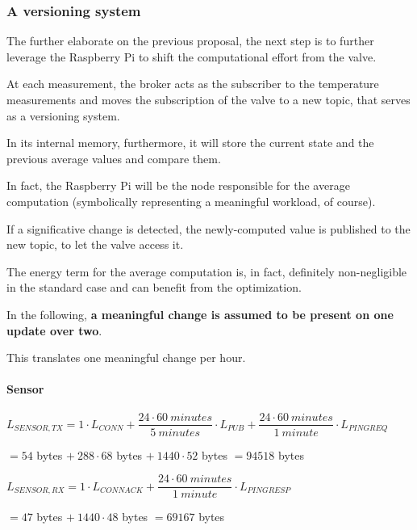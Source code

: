 \documentclass[a4paper,11pt]{article} %
\begin{document}
    \subsubsection{A versioning system}
    The further elaborate on the previous proposal, the next step is to further leverage the Raspberry Pi to shift the computational effort from the valve.

    At each measurement, the broker acts as the subscriber to the temperature measurements and moves the subscription of the valve to a new topic, that serves as a versioning system.

    In its internal memory, furthermore, it will store the current state and the previous average values and compare them.

    In fact, the Raspberry Pi will be the node responsible for the average computation (symbolically representing a meaningful workload, of course).

    If a significative change is detected, the newly-computed value is published to the new topic, to let the valve access it.

    The energy term for the average computation is, in fact, definitely non-negligible in the standard case and can benefit from the optimization.

    \smallskip

    In the following, \textbf{a meaningful change is assumed to be present on one update over two}.

    This translates one meaningful change per hour.

    \paragraph{Sensor}

    $L_{SENSOR, TX} = 1 \cdot L_{CONN} + \dfrac{24 \cdot 60\ minutes}{5\ minutes} \cdot L_{PUB} + \dfrac{24 \cdot 60\ minutes}{1\ minute} \cdot L_{PINGREQ}$

    \medskip

    \qquad \qquad \qquad $ = 54$ bytes $+\ 288 \cdot 68$ bytes $+\ 1440 \cdot 52$ bytes $ = 94518$ bytes

    \medskip

    $L_{SENSOR, RX} = 1 \cdot L_{CONNACK} + \dfrac{24 \cdot 60\ minutes}{1\ minute} \cdot L_{PINGRESP}$

    \medskip

    \qquad \qquad \qquad $= 47$ bytes $+\ 1440 \cdot 48$ bytes $ = 69167$ bytes
\end{document}
